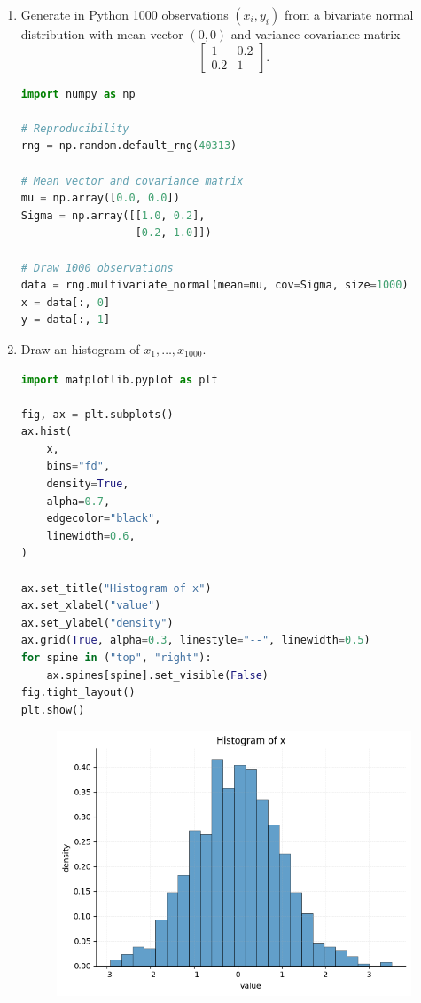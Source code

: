 \documentclass[dvipsnames,11pt]{article}
\begin{document}
    \begin{enumerate}
        \item Generate in Python 1000 observations $(x_i,y_i)$ from a bivariate normal distribution with mean vector $(0,0)$ and variance-covariance matrix
            \[
            \left[
            \begin{array}{cc}
            1&0.2\\
            0.2&1
            \end{array}
            \right].
            \]

            \begin{solution}

\begin{lstlisting}[language=python]
import numpy as np

# Reproducibility
rng = np.random.default_rng(40313)

# Mean vector and covariance matrix
mu = np.array([0.0, 0.0])
Sigma = np.array([[1.0, 0.2],
                  [0.2, 1.0]])

# Draw 1000 observations
data = rng.multivariate_normal(mean=mu, cov=Sigma, size=1000)
x = data[:, 0]
y = data[:, 1]
\end{lstlisting}
            
            \end{solution}
        
        \item Draw an histogram of $x_1,\dots,x_{1000}$.

            \begin{solution}
    
\begin{lstlisting}[language=python]
import matplotlib.pyplot as plt

fig, ax = plt.subplots()
ax.hist(
    x,
    bins="fd",
    density=True,
    alpha=0.7,
    edgecolor="black",
    linewidth=0.6,
)

ax.set_title("Histogram of x")
ax.set_xlabel("value")
ax.set_ylabel("density")
ax.grid(True, alpha=0.3, linestyle="--", linewidth=0.5)
for spine in ("top", "right"):
    ax.spines[spine].set_visible(False)
fig.tight_layout()
plt.show()

\end{lstlisting}

                \begin{figure}[h]
                    \centering
                    \includegraphics[width=0.5\linewidth]{q2b.png}
                \end{figure}
                

\end{solution}
\end{enumerate}
\end{document}
